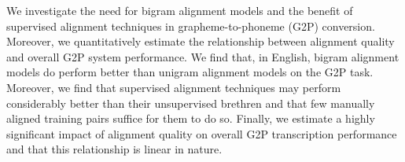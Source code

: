 We investigate the need for bigram alignment models and the benefit of supervised alignment techniques in grapheme-to-phoneme (G2P) conversion. Moreover, we quantitatively estimate the relationship between alignment quality and overall G2P system performance. We find that, in English, bigram alignment models do perform better than unigram alignment models on the G2P task. Moreover, we find that supervised alignment techniques may perform considerably better than their unsupervised brethren and that few manually aligned training pairs suffice for them to do so. Finally, we estimate a highly significant impact of alignment quality on overall G2P transcription performance and that this relationship is linear in nature.
